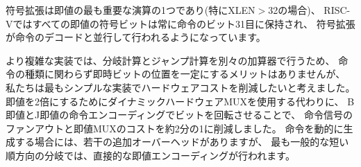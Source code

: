 \begin{commentary}
\begin{comment}
Sign-extension is one of the most critical operations on immediates
(particularly for XLEN$>$32), and in RISC-V the sign bit for all immediates
is always held in bit 31 of the instruction to allow sign-extension to
proceed in parallel with instruction decoding.
\end{comment}

符号拡張は即値の最も重要な演算の1つであり(特にXLEN$>$32の場合)、
RISC-Vではすべての即値の符号ビットは常に命令のビット31目に保持され、
符号拡張が命令のデコードと並行して行われるようになっています。

\begin{comment}
Although more complex implementations might have separate adders for
branch and jump calculations and so would not benefit from keeping the
location of immediate bits constant across types of instruction, we
wanted to reduce the hardware cost of the simplest implementations.
By rotating bits in the instruction encoding of B and J immediates
instead of using dynamic hardware muxes to multiply the immediate by
2, we reduce instruction signal fanout and immediate mux costs by
around a factor of 2.  The scrambled immediate encoding will add
negligible time to static or ahead-of-time compilation.  For dynamic
generation of instructions, there is some small additional
overhead, but the most common short forward branches have
straightforward immediate encodings.
\end{comment}

より複雑な実装では、分岐計算とジャンプ計算を別々の加算器で行うため、
命令の種類に関わらず即時ビットの位置を一定にするメリットはありませんが、
私たちは最もシンプルな実装でハードウェアコストを削減したいと考えました。
即値を2倍にするためにダイナミックハードウェアMUXを使用する代わりに、
B即値とJ即値の命令エンコーディングでビットを回転させることで、
命令信号のファンアウトと即値MUXのコストを約2分の1に削減しました。 
命令を動的に生成する場合には、若干の追加オーバーヘッドがありますが、
最も一般的な短い順方向の分岐では、直接的な即値エンコーディングが行われます。
\end{commentary}

\begin{comment}
\section{Integer Computational Instructions}

Most integer computational instructions operate on XLEN bits of values
held in the integer register file.  Integer computational instructions
are either encoded as register-immediate operations using the I-type
format or as register-register operations using the R-type format.
The destination is register {\em rd} for both register-immediate and
register-register instructions.  No integer computational instructions
cause arithmetic exceptions.
\end{comment}

